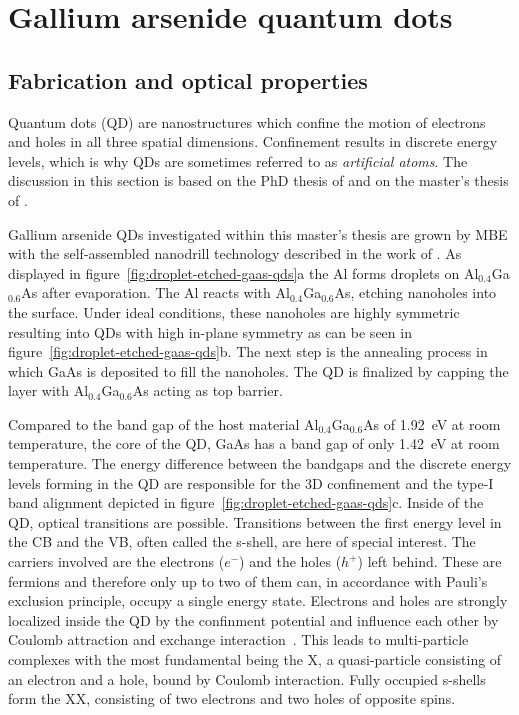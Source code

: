 \chapter{Gallium arsenide quantum dots}
\label{chapter:quantum-dot}

\section{Fabrication and optical properties}

Quantum dots (\acs{QD}) are nanostructures which confine the motion of electrons and holes in all three spatial dimensions.
Confinement results in discrete energy levels, which is why \acp{QD} are sometimes referred to as \textit{artificial atoms}.
The discussion in this section is based on the PhD thesis of \textcite{huber_gaas_2019} and on the master's thesis of \textcite{schimpf_towards_2017}.

Gallium arsenide \acp{QD} investigated within this master's thesis are grown by \ac{MBE} with the self-assembled nanodrill technology described in the work of \textcite{wang_nanoholes_2007}.
As displayed in figure~\ref{fig:droplet-etched-gaas-qds}a the Al forms droplets on Al$_{0.4}$Ga$_{0.6}$As after evaporation.
The Al reacts with Al$_{0.4}$Ga$_{0.6}$As, etching nanoholes into the surface.
Under ideal conditions, these nanoholes are highly symmetric resulting into \acp{QD} with high in-plane symmetry  as can be seen in figure~\ref{fig:droplet-etched-gaas-qds}b.
The next step is the annealing process in which GaAs is deposited to fill the nanoholes.
The \ac{QD} is finalized by capping the layer with Al$_{0.4}$Ga$_{0.6}$As acting as top barrier.

Compared to the band gap of the host material Al$_{0.4}$Ga$_{0.6}$As of \SI{1.92}{\electronvolt} at room temperature, the core of the \ac{QD}, GaAs has a band gap of only \SI{1.42}{\electronvolt} at room temperature.
The energy difference between the bandgaps and the discrete energy levels forming in the \ac{QD} are responsible for the $3$D confinement and the type-I band alignment depicted in figure~\ref{fig:droplet-etched-gaas-qds}c.
Inside of the \ac{QD}, optical transitions are possible.
Transitions between the first energy level in the \ac{CB} and the \ac{VB}, often called the s-shell, are here of special interest.
The carriers involved are the electrons ($e^-$) and the holes ($h^+$) left behind.
These are fermions and therefore only up to two of them can, in accordance with Pauli's exclusion principle, occupy a single energy state.
Electrons and holes are strongly localized inside the \ac{QD} by the confinment potential and influence each other by Coulomb attraction and exchange interaction~\cite{bimberg_quantum_1999}.
This leads to multi-particle complexes with the most fundamental being the \acf{X}, a quasi-particle consisting of an electron and a hole, bound by Coulomb interaction.
Fully occupied s-shells form the \acf{XX}, consisting of two electrons and two holes of opposite spins.


